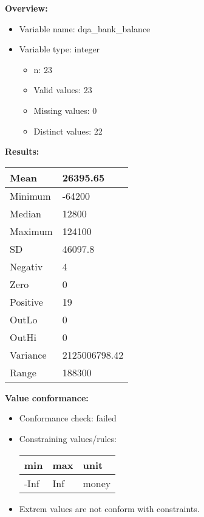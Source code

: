 \documentclass[
]{article}
\providecommand{\tightlist}{%
  \setlength{\itemsep}{0pt}\setlength{\parskip}{0pt}}
\begin{document}
\textbf{Overview:}

\begin{itemize}
\tightlist
\item
  Variable name: dqa\_bank\_balance
\item
  Variable type: integer

  \begin{itemize}
  \tightlist
  \item
    n: 23
  \item
    Valid values: 23
  \item
    Missing values: 0
  \item
    Distinct values: 22
  \end{itemize}
\end{itemize}

\textbf{Results:}\\

\begin{table}[H]
\centering
\begin{tabular}{l|l}
\hline
Mean & 26395.65\\
\hline
Minimum & -64200\\
\hline
Median & 12800\\
\hline
Maximum & 124100\\
\hline
SD & 46097.8\\
\hline
Negativ & 4\\
\hline
Zero & 0\\
\hline
Positive & 19\\
\hline
OutLo & 0\\
\hline
OutHi & 0\\
\hline
Variance & 2125006798.42\\
\hline
Range & 188300\\
\hline
\end{tabular}
\end{table}

\textbf{Value conformance:}

\begin{itemize}
\tightlist
\item
  Conformance check: failed
\item
  Constraining values/rules:

  \begin{table}[H]
  \centering
  \begin{tabular}{l|l|l}
  \hline
  \textbf{min} & \textbf{max} & \textbf{unit}\\
  \hline
  -Inf & Inf & money\\
  \hline
  \end{tabular}
  \end{table}
\item
  Extrem values are not conform with constraints.
\end{itemize}
\end{document}
